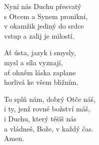 \begin{translatioMulticol}{3}
Nyní nás Duchu přesvatý\\
s Otcem a Synem pronikni,\\
v okamžik jediný do srdce\\
vstup a zalij je milostí.\columnbreak

Ať ústa, jazyk i smysly,\\
mysl a síla vyznají,\\
ať ohněm láska zaplane\\
horlivá ke všem bližním.\columnbreak

To splň nám, dobrý Otče náš,\\
i ty, jenž rovné božství máš,\\
i Duchu, který těšíš nás\\
a vládneš, Bože, v každý čas.\\
Amen.
\end{translatioMulticol}
